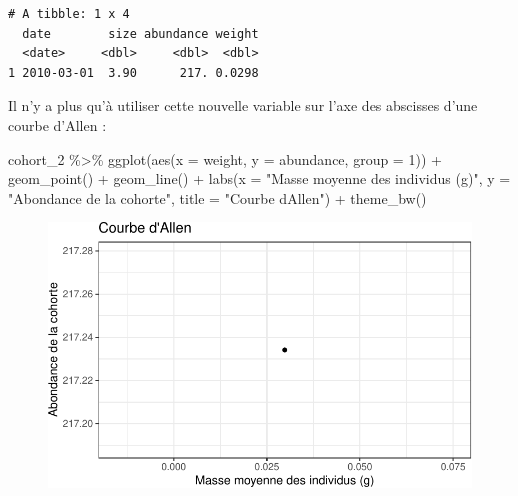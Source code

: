 \documentclass[
  a4paper,
  DIV=11,
  numbers=noendperiod,
  oneside]{scrreprt}
\newenvironment{Shaded}{}{}
\newcommand{\AttributeTok}[1]{\textcolor[rgb]{0.84,0.23,0.29}{#1}}
\newcommand{\DecValTok}[1]{\textcolor[rgb]{0.00,0.36,0.77}{#1}}
\newcommand{\FunctionTok}[1]{\textcolor[rgb]{0.44,0.26,0.76}{#1}}
\newcommand{\NormalTok}[1]{\textcolor[rgb]{0.14,0.16,0.18}{#1}}
\newcommand{\SpecialCharTok}[1]{\textcolor[rgb]{0.00,0.36,0.77}{#1}}
\newcommand{\StringTok}[1]{\textcolor[rgb]{0.01,0.18,0.38}{#1}}
\begin{document}
\begin{verbatim}
# A tibble: 1 x 4
  date        size abundance weight
  <date>     <dbl>     <dbl>  <dbl>
1 2010-03-01  3.90      217. 0.0298
\end{verbatim}

Il n'y a plus qu'à utiliser cette nouvelle variable sur l'axe des
abscisses d'une courbe d'Allen :

\begin{Shaded}
\begin{Highlighting}[]
\NormalTok{cohort\_2 }\SpecialCharTok{\%\textgreater{}\%}
  \FunctionTok{ggplot}\NormalTok{(}\FunctionTok{aes}\NormalTok{(}\AttributeTok{x =}\NormalTok{ weight, }\AttributeTok{y =}\NormalTok{ abundance, }\AttributeTok{group =} \DecValTok{1}\NormalTok{)) }\SpecialCharTok{+}
  \FunctionTok{geom\_point}\NormalTok{() }\SpecialCharTok{+}
  \FunctionTok{geom\_line}\NormalTok{() }\SpecialCharTok{+}
  \FunctionTok{labs}\NormalTok{(}\AttributeTok{x =} \StringTok{"Masse moyenne des individus (g)"}\NormalTok{,}
       \AttributeTok{y =} \StringTok{"Abondance de la cohorte"}\NormalTok{,}
       \AttributeTok{title =} \StringTok{"Courbe d\textquotesingle{}Allen"}\NormalTok{) }\SpecialCharTok{+}
  \FunctionTok{theme\_bw}\NormalTok{()}
\end{Highlighting}
\end{Shaded}

\begin{figure}[H]


{\centering \includegraphics{04-Cohortes_files/figure-pdf/fig-biomasse-1.pdf}

}

\end{figure}
\end{document}

